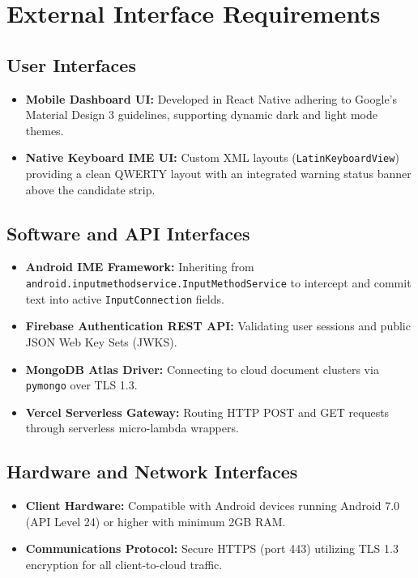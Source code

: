 \documentclass[A4paper,12pt]{report}
\theoremstyle{plain}
\theoremstyle{definition}
\theoremstyle{remark}
\numberwithin{equation}{section}
\begin{document}
\section{External Interface Requirements}
\subsection{User Interfaces}
\begin{itemize}[leftmargin=*]
    \item \textbf{Mobile Dashboard UI:} Developed in React Native adhering to Google's Material Design 3 guidelines, supporting dynamic dark and light mode themes.
    \item \textbf{Native Keyboard IME UI:} Custom XML layouts (\texttt{LatinKeyboardView}) providing a clean QWERTY layout with an integrated warning status banner above the candidate strip.
\end{itemize}

\subsection{Software and API Interfaces}
\begin{itemize}[leftmargin=*]
    \item \textbf{Android IME Framework:} Inheriting from \texttt{android.inputmethodservice.InputMethodService} to intercept and commit text into active \texttt{InputConnection} fields.
    \item \textbf{Firebase Authentication REST API:} Validating user sessions and public JSON Web Key Sets (JWKS).
    \item \textbf{MongoDB Atlas Driver:} Connecting to cloud document clusters via \texttt{pymongo} over TLS 1.3.
    \item \textbf{Vercel Serverless Gateway:} Routing HTTP POST and GET requests through serverless micro-lambda wrappers.
\end{itemize}

\subsection{Hardware and Network Interfaces}
\begin{itemize}[leftmargin=*]
    \item \textbf{Client Hardware:} Compatible with Android devices running Android 7.0 (API Level 24) or higher with minimum 2GB RAM.
    \item \textbf{Communications Protocol:} Secure HTTPS (port 443) utilizing TLS 1.3 encryption for all client-to-cloud traffic.
\end{itemize}
\end{document}
